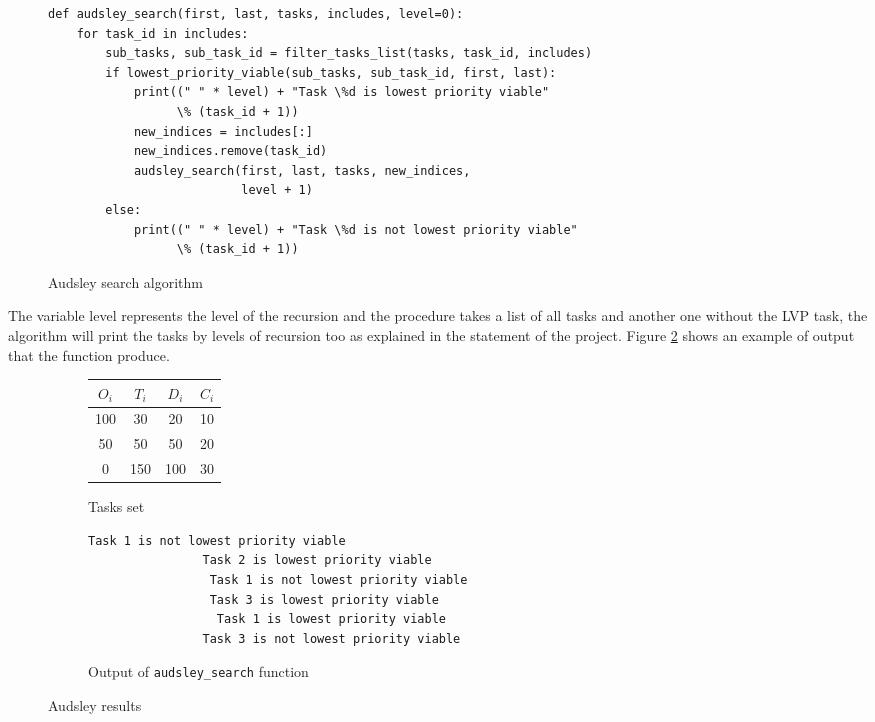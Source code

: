 \documentclass[letterpaper]{article}
\begin{document}
\begin{figure}[H]
    \begin{lstlisting}
def audsley_search(first, last, tasks, includes, level=0):
    for task_id in includes:
        sub_tasks, sub_task_id = filter_tasks_list(tasks, task_id, includes)
        if lowest_priority_viable(sub_tasks, sub_task_id, first, last):
            print((" " * level) + "Task \%d is lowest priority viable"
                  \% (task_id + 1))
            new_indices = includes[:]
            new_indices.remove(task_id)
            audsley_search(first, last, tasks, new_indices,
                           level + 1)
        else:
            print((" " * level) + "Task \%d is not lowest priority viable"
                  \% (task_id + 1))
    \end{lstlisting}
    \caption{Audsley search algorithm}
    \label{fig:audsley_search}
\end{figure}


The variable level represents the level
of the recursion and the procedure takes a list of all tasks and another
one without the LVP task, the algorithm will print the tasks by levels of
recursion too as explained in the statement of the project.
Figure \ref{fig:audsley_results} shows an example of output that the function
produce.

\begin{figure}[H]

    \begin{subfigure}{1\textwidth}
        \centering
        \begin{tabular}{c c c c}
         $O_i$ & $T_i$ & $D_i$ & $C_i$  \\
        \hline
        100 & 30 & 20 & 10 \\
        50 & 50 & 50 & 20 \\
        0 & 150 & 100 & 30 \\
        \end{tabular}
        \caption{Tasks set}
    \end{subfigure}
    \begin{subfigure}{1\textwidth}

        \begin{lstlisting}[numbers=none,language=bash]
                Task 1 is not lowest priority viable
                Task 2 is lowest priority viable
                 Task 1 is not lowest priority viable
                 Task 3 is lowest priority viable
                  Task 1 is lowest priority viable
                Task 3 is not lowest priority viable
        \end{lstlisting}
        \caption{Output of \texttt{audsley\_search} function}
    \end{subfigure}
    \caption{Audsley results}
    \label{fig:audsley_results}
\end{figure}
\end{document}
